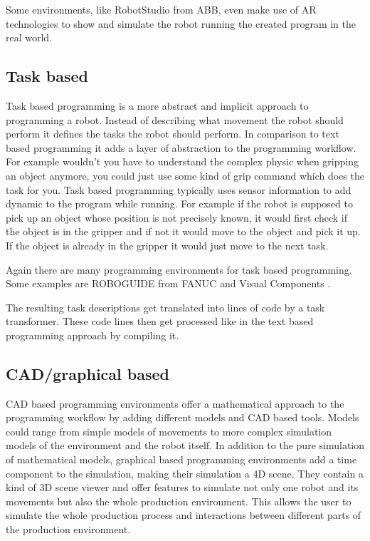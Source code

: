 \documentclass[conference]{IEEEtran}
\begin{document}
        Some environments, like RobotStudio from ABB, even make use of AR technologies to show and simulate the robot running the created program in the real world. \cite{i4}

    \subsection{Task based}

        Task based programming is a more abstract and implicit approach to programming a robot. Instead of describing what movement the robot should perform it defines the tasks the robot should perform. In comparison to text based programming it adds a layer of abstraction to the programming workflow. For example wouldn't you have to understand the complex physic when gripping an object anymore, you could just use some kind of grip command which does the task for you. 
        Task based programming typically uses sensor information to add dynamic to the program while running. For example if the robot is supposed to pick up an object whose position is not precisely known, it would first check if the object is in the gripper and if not it would move to the object and pick it up. If the object is already in the gripper it would just move to the next task. \cite[pp. 114 - 115]{b1}

        Again there are many programming environments for task based programming. Some examples are ROBOGUIDE from FANUC \cite{i3} and Visual Components \cite{i5}.

        The resulting task descriptions get translated into lines of code by a task transformer. These code lines then get processed like in the text based programming approach by compiling it. \cite[p. 115]{b1}
        

    \subsection{CAD/graphical based}

        CAD based programming environments offer a mathematical approach to the programming workflow by adding different models and CAD based tools.
        Models could range from simple models of movements to more complex simulation models of the environment and the robot itself.
        In addition to the pure simulation of mathematical models, graphical based programming environments add a time component to the simulation, making their simulation a 4D scene.
        They contain a kind of 3D scene viewer and offer features to simulate not only one robot and its movements but also the whole production environment. This allows the user to simulate the whole production process and interactions between different parts of the production environment. \cite[pp. 192 - 194]{b4}
\end{document}
